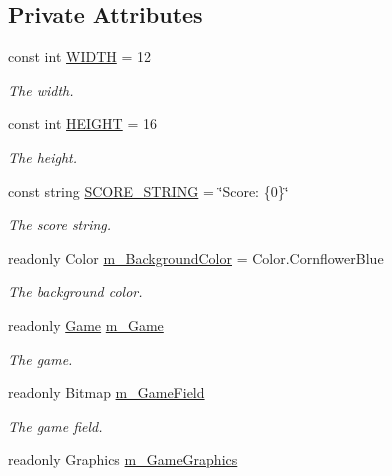 \subsection*{Private Attributes}
\begin{DoxyCompactItemize}
\item 
const int \mbox{\hyperlink{class_snake_1_1_window_a9062ddbb391d972a1d4463c9dffb92ed}{W\+I\+D\+TH}} = 12
\begin{DoxyCompactList}\small\item\em The width. \end{DoxyCompactList}\item 
const int \mbox{\hyperlink{class_snake_1_1_window_ad3db1ce4b9762bfe200fc4edaa82c7be}{H\+E\+I\+G\+HT}} = 16
\begin{DoxyCompactList}\small\item\em The height. \end{DoxyCompactList}\item 
const string \mbox{\hyperlink{class_snake_1_1_window_a0337ab5c01feaab19ef7a417a008e894}{S\+C\+O\+R\+E\+\_\+\+S\+T\+R\+I\+NG}} = \char`\"{}Score\+: \{0\}\char`\"{}
\begin{DoxyCompactList}\small\item\em The score string. \end{DoxyCompactList}\item 
readonly Color \mbox{\hyperlink{class_snake_1_1_window_ab061ad97897287fd387ab3257afbc027}{m\+\_\+\+Background\+Color}} = Color.\+Cornflower\+Blue
\begin{DoxyCompactList}\small\item\em The background color. \end{DoxyCompactList}\item 
readonly \mbox{\hyperlink{class_snake_1_1_game}{Game}} \mbox{\hyperlink{class_snake_1_1_window_aeee75245fe3e664d795f65afe73de094}{m\+\_\+\+Game}}
\begin{DoxyCompactList}\small\item\em The game. \end{DoxyCompactList}\item 
readonly Bitmap \mbox{\hyperlink{class_snake_1_1_window_a89c7994cf627a96ff1d1a1a3cd0ea93e}{m\+\_\+\+Game\+Field}}
\begin{DoxyCompactList}\small\item\em The game field. \end{DoxyCompactList}\item 
readonly Graphics \mbox{\hyperlink{class_snake_1_1_window_ab9d41c8c542f96d4b3b5e24eceb44353}{m\+\_\+\+Game\+Graphics}}

\end{DoxyCompactItemize}
